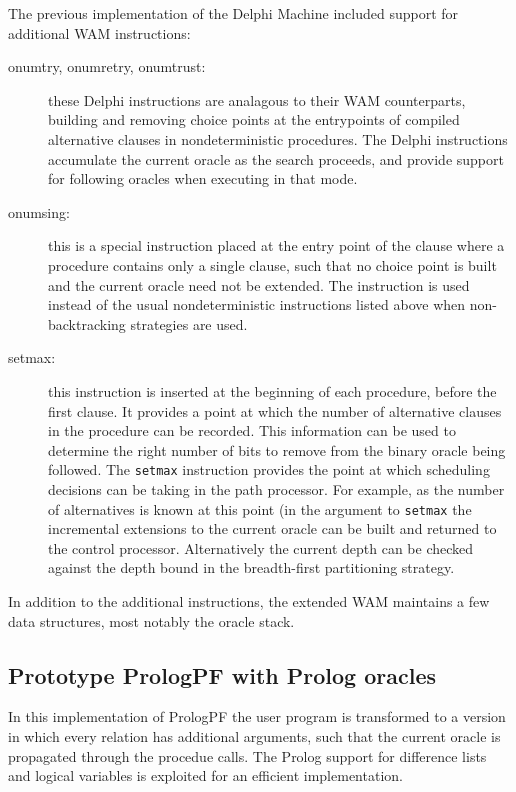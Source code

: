 The previous implementation of the Delphi Machine \cite{Kle91,Sar95} included
support for additional WAM \cite{War83} instructions:
\begin{description}
\item[onumtry, onumretry, onumtrust:]{ these Delphi instructions are analagous
  to their WAM counterparts, building and removing choice points at the
  entrypoints of compiled alternative clauses in nondeterministic procedures.  The
  Delphi instructions accumulate the current oracle as the search proceeds, and
  provide support for following oracles when executing in that mode.}
\item[onumsing:]{ this is a special instruction placed at the entry point of the
  clause where a procedure contains only a single clause, such that no choice
  point is built and the current oracle need not be extended.  The instruction
  is used instead of the usual nondeterministic instructions listed above when
  non-backtracking strategies are used.}
\item[setmax:]{ this instruction is inserted at the beginning of each procedure,
  before the first clause.  It provides a point at which the number of alternative
  clauses in the procedure can be recorded.  This information can be used to
  determine the right number of bits to remove from the binary oracle being
  followed.  The \texttt{setmax} instruction provides the point at which
  scheduling decisions can be taking in the path processor.  For example, as
  the number of alternatives is known at this point (in the argument to
  \texttt{setmax} the incremental extensions to the current oracle can be built
  and returned to the control processor.  Alternatively the current depth can
  be checked against the depth bound in the breadth-first partitioning
  strategy.}
\end{description}

In addition to the additional instructions, the extended WAM maintains a
few data structures, most notably the oracle stack.

\subsection{Prototype PrologPF with Prolog oracles}

In this implementation of PrologPF the user program is transformed to a 
version in which every relation has additional arguments, such that the
current oracle is propagated through the procedue calls.  The Prolog
support for difference lists and logical variables is exploited for an
efficient implementation.

